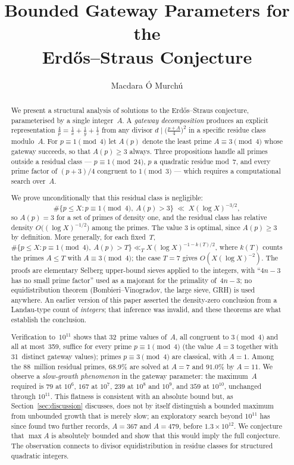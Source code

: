 \documentclass[12pt]{amsart}
\title[Bounded Gateway Parameters]
{Bounded Gateway Parameters for the\\
Erd\H{o}s--Straus Conjecture}
\author{Macdara \'O Murch\'u}
\theoremstyle{definition}
\theoremstyle{remark}
\begin{document}
\begin{abstract}
We present a structural analysis of solutions to the Erd\H{o}s--Straus
conjecture, parameterised by a single integer~$A$.
A \emph{gateway decomposition} produces an explicit representation
$\frac{4}{p} = \frac{1}{x} + \frac{1}{y} + \frac{1}{z}$
from any divisor $d \mid \bigl(\frac{p+A}{4}\bigr)^{\!2}$ in a
specific residue class modulo~$A$.
For $p \equiv 1 \pmod 4$ let $A(p)$ denote the least prime
$A \equiv 3 \pmod 4$ whose gateway succeeds, so that $A(p) \geq 3$
always.
Three propositions handle all primes outside a residual class ---
$p \equiv 1 \pmod{24}$, $p$ a quadratic residue mod~$7$, and every
prime factor of $(p+3)/4$ congruent to $1 \pmod 3$ --- which requires
a computational search over~$A$.

We prove unconditionally that this residual class is negligible:
\[
  \#\{p \leq X : p \equiv 1 \!\!\pmod 4,\ A(p) > 3\}
  \;\ll\; X (\log X)^{-3/2},
\]
so $A(p) = 3$ for a set of primes of density one, and the residual
class has relative density $O\bigl((\log X)^{-1/2}\bigr)$ among the
primes.  The value $3$ is optimal, since $A(p) \geq 3$ by definition.
More generally, for each fixed~$T$,
$\#\{p \leq X : p \equiv 1 \pmod 4,\ A(p) > T\} \ll_T
X(\log X)^{-1-k(T)/2}$, where $k(T)$ counts the primes $A \leq T$ with
$A \equiv 3 \pmod 4$; the case $T = 7$ gives $O(X(\log X)^{-2})$.
The proofs are elementary Selberg upper-bound sieves applied to the
integers, with ``$4n-3$ has no small prime factor'' used as a majorant
for the primality of~$4n-3$; no equidistribution theorem
(Bombieri--Vinogradov, the large sieve, GRH) is used anywhere.
An earlier version of this paper asserted the density-zero conclusion
from a Landau-type count of \emph{integers}; that inference was
invalid, and these theorems are what establish the conclusion.

Verification to~$10^{11}$ shows that 32~prime values of~$A$, all
congruent to $3 \pmod 4$ and all at most~359, suffice for every prime
$p \equiv 1 \pmod 4$ (the value $A = 3$ together with 31~distinct
gateway values); primes $p \equiv 3 \pmod 4$ are classical, with
$A = 1$.
Among the $88$~million residual primes, $68.9\%$ are solved at $A = 7$
and $91.0\%$ by $A = 11$.
We observe a \emph{slow-growth phenomenon} in the gateway parameter:
the maximum~$A$ required is $79$ at $10^6$, $167$ at $10^7$, $239$ at
$10^8$ and $10^9$, and $359$ at $10^{10}$, unchanged through $10^{11}$.
This flatness is consistent with an absolute bound but, as
Section~\ref{sec:discussion} discusses, does not by itself distinguish
a bounded maximum from unbounded growth that is merely slow; an
exploratory search beyond $10^{11}$ has since found two further
records, $A = 367$ and $A = 479$, before $1.3 \times 10^{12}$.
We conjecture that $\max A$ is absolutely bounded and show that
this would imply the full conjecture.
The observation connects to divisor equidistribution
in residue classes for structured quadratic integers.
\end{abstract}
\end{document}
